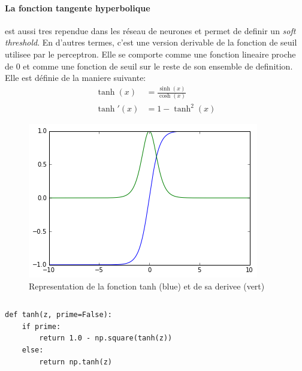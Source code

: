 \documentclass[11pt]{article}
\begin{document}
\newpage
\paragraph{La fonction tangente hyperbolique} est aussi tres rependue dans les
r\'eseau de neurones et permet de definir un {\em soft threshold}. En d'autres termes,
c'est une version derivable de la fonction de seuil utilisee par le perceptron.
Elle se comporte comme une fonction lineaire proche de 0 et comme une fonction
de seuil sur le reste de son ensemble de definition.
Elle est d\'efinie de la maniere suivante:
\begin{equation}
	\begin{aligned}
		\tanh(x)  &= \frac{\sinh(x)}{\cosh(x)} \\
		\tanh'(x) &= 1-\tanh^2(x)
	\end{aligned}
\end{equation}
\begin{figure}[htp]
	\centering
	\includegraphics[scale=.5]{img/act_tanh.png}
	\caption{Representation de la fonction tanh (blue) et de sa derivee (vert)}
\end{figure}
\begin{equation}
\end{equation}

\begin{lstlisting}
def tanh(z, prime=False):
    if prime:
		return 1.0 - np.square(tanh(z))
	else:
		return np.tanh(z)
\end{lstlisting}

\newpage
\end{document}

